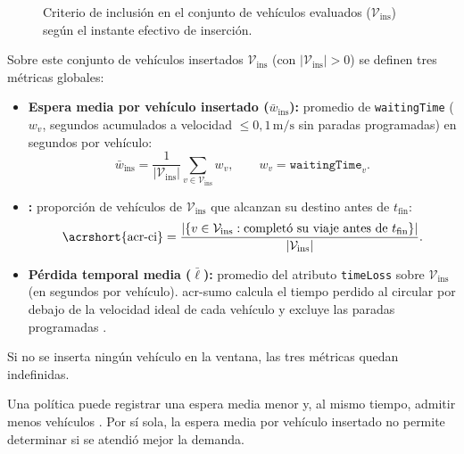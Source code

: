 \begin{figure}[!htbp]
\centering

\caption{Criterio de inclusión en el conjunto de vehículos evaluados ($\mathcal{V}_{\mathrm{ins}}$) según el instante efectivo de inserción.}
\label{fig:cohorte_evaluacion}
\end{figure}
\FloatBarrier

Sobre este conjunto de vehículos insertados $\mathcal{V}_{\mathrm{ins}}$ (con $|\mathcal{V}_{\mathrm{ins}}| > 0$) se definen tres métricas globales:
\begin{itemize}
    \item \textbf{Espera media por vehículo insertado ($\bar{w}_{\mathrm{ins}}$):} promedio de \texttt{waitingTime} ($w_v$, segundos acumulados a velocidad $\le 0{,}1\,\text{m/s}$ sin paradas programadas) en segundos por vehículo:
    \begin{equation}
        \bar{w}_{\mathrm{ins}} = \frac{1}{|\mathcal{V}_{\mathrm{ins}}|} \sum_{v\in\mathcal{V}_{\mathrm{ins}}} w_v,
        \qquad w_v=\texttt{waitingTime}_v .
        \label{eq:espera_media_insertados}
    \end{equation}
    \item \textbf{:} proporción de vehículos de $\mathcal{V}_{\mathrm{ins}}$ que alcanzan su destino antes de $t_{\mathrm{fin}}$:
    \begin{equation}
        \text{\acrshort{acr-ci}} = \frac{|\{v \in \mathcal{V}_{\mathrm{ins}} : \text{completó su viaje antes de } t_{\mathrm{fin}}\}|}{|\mathcal{V}_{\mathrm{ins}}|}.
        \label{eq:tasa_completitud}
    \end{equation}
    \item \textbf{Pérdida temporal media ($\bar{\ell}$):} promedio del atributo \texttt{timeLoss} sobre $\mathcal{V}_{\mathrm{ins}}$ (en segundos por vehículo). \acrshort{acr-sumo} calcula el tiempo perdido al circular por debajo de la velocidad ideal de cada vehículo y excluye las paradas programadas \cite{SUMO2026_TripInfo}.
\end{itemize}

Si no se inserta ningún vehículo en la ventana, las tres métricas quedan indefinidas.

Una política puede registrar una espera media menor y, al mismo tiempo, admitir menos vehículos \cite{jiang2024xlight}. Por sí sola, la espera media por vehículo insertado no permite determinar si se atendió mejor la demanda.

